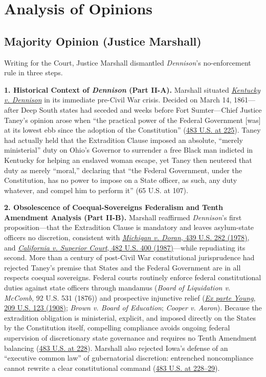 \documentclass[12pt]{article}
\begin{document}
\section{Analysis of Opinions}
\subsection{Majority Opinion (Justice Marshall)}

Writing for the Court, Justice Marshall dismantled \emph{Dennison}'s no-enforcement rule in three steps.

\textbf{1. Historical Context of \emph{Dennison} (Part II-A).} Marshall situated \href{https://supreme.justia.com/cases/federal/us/65/66/}{\emph{Kentucky v. Dennison}} in its immediate pre-Civil War crisis. Decided on March 14, 1861---after Deep South states had seceded and weeks before Fort Sumter---Chief Justice Taney's opinion arose when ``the practical power of the Federal Government [was] at its lowest ebb since the adoption of the Constitution'' (\href{https://supreme.justia.com/cases/federal/us/483/219/}{483 U.S. at 225}). Taney had actually held that the Extradition Clause imposed an absolute, ``merely ministerial'' duty on Ohio's Governor to surrender a free Black man indicted in Kentucky for helping an enslaved woman escape, yet Taney then neutered that duty as merely ``moral,'' declaring that ``the Federal Government, under the Constitution, has no power to impose on a State officer, as such, any duty whatever, and compel him to perform it'' (65 U.S. at 107).

\textbf{2. Obsolescence of Coequal-Sovereigns Federalism and Tenth Amendment Analysis (Part II-B).} Marshall reaffirmed \emph{Dennison}'s first proposition---that the Extradition Clause is mandatory and leaves asylum-state officers no discretion, consistent with \href{https://supreme.justia.com/cases/federal/us/439/282/}{\emph{Michigan v. Doran}, 439 U.S. 282 (1978)}, and \href{https://supreme.justia.com/cases/federal/us/482/400/}{\emph{California v. Superior Court}, 482 U.S. 400 (1987)}---while repudiating its second. More than a century of post-Civil War constitutional jurisprudence had rejected Taney's premise that States and the Federal Government are in all respects coequal sovereigns. Federal courts routinely enforce federal constitutional duties against state officers through mandamus (\emph{Board of Liquidation v. McComb}, 92 U.S. 531 (1876)) and prospective injunctive relief (\href{https://supreme.justia.com/cases/federal/us/209/123/}{\emph{Ex parte Young}, 209 U.S. 123 (1908)}; \emph{Brown v. Board of Education}; \emph{Cooper v. Aaron}). Because the extradition obligation is ministerial, explicit, and imposed directly on the States by the Constitution itself, compelling compliance avoids ongoing federal supervision of discretionary state governance and requires no Tenth Amendment balancing (\href{https://supreme.justia.com/cases/federal/us/483/219/}{483 U.S. at 228}). Marshall also rejected Iowa's defense of an ``executive common law'' of gubernatorial discretion: entrenched noncompliance cannot rewrite a clear constitutional command (\href{https://supreme.justia.com/cases/federal/us/483/219/}{483 U.S. at 228--29}).
\end{document}
